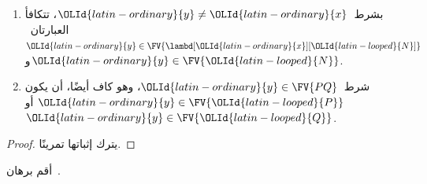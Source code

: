 \documentclass[../../../include/open-logic-section]{subfiles}
\begin{document}
\begin{lem}
  \begin{enumerate}
    \item {} بشرط~$\OLId{latin-ordinary}{y} \neq \OLId{latin-ordinary}{x}$، تتكافأ العبارتان~$\OLId{latin-ordinary}{y} \in
      \FV{\lambd[\OLId{latin-ordinary}{x}][\OLId{latin-looped}{N}]}$ و$\OLId{latin-ordinary}{y} \in \FV{\OLId{latin-looped}{N}}$.
    \item {} شرط~$\OLId{latin-ordinary}{y} \in \FV{PQ}$، وهو كاف أيضًا، أن يكون
      $\OLId{latin-ordinary}{y} \in \FV{\OLId{latin-looped}{P}}$ أو~$\OLId{latin-ordinary}{y} \in \FV{\OLId{latin-looped}{Q}}$.
    \end{enumerate}
\end{lem}

\begin{proof}
  يترك إثباتها تمرينًا.
\end{proof}

\begin{prob}
  أقم برهان~.
\end{prob}
\end{document}
